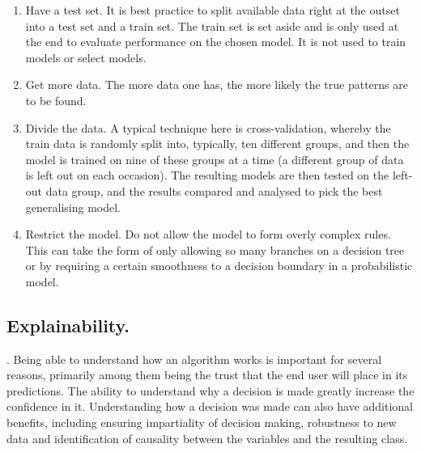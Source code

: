 \begin{enumerate}

\item{Have a test set.} It is best practice to split available data right at the outset into a test set and a train set. The train set is set aside and is only used at the end to evaluate performance on the chosen model. It is not used to train models or select models.

\item{Get more data.} The more data one has, the more likely the true patterns are to be found.

\item{Divide the data.} A typical technique here is cross-validation, whereby the train data is randomly split into, typically, ten different groups, and then the model is trained on nine of these groups at a time (a different group of data is left out on each occasion). The resulting models are then tested on the left-out data group, and the results compared and analysed to pick the best generalising model.

\item{Restrict the model.} Do not allow the model to form overly complex rules. This can take the form of only allowing so many branches on a decision tree or by requiring a certain smoothness to a decision boundary in a probabilistic model.

\end{enumerate} 


\subsection{Explainability.}   \parencite{arrieta2020explainable}. Being able to understand how an algorithm works is important for several reasons, primarily among them being the trust that the end user will place in its predictions. The ability to understand why a decision is made greatly increase the confidence in it. Understanding how a decision was made can also have additional benefits, including ensuring impartiality of decision making, robustness to new data and identification of causality between the variables and the resulting class.

